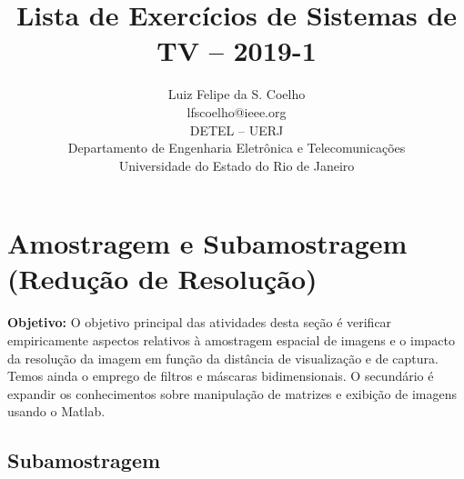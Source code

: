 \documentclass[11pt]{article}
\begin{document}
 

\title{Lista de Exercícios de Sistemas de TV -- 2019-1}
\author{Luiz Felipe da S. Coelho \\ lfscoelho@ieee.org \\ DETEL -- UERJ \\ Departamento de Engenharia Eletrônica e Telecomunicações \\ Universidade do Estado do Rio de Janeiro}

\maketitle

\section{Amostragem e Subamostragem (Redução de Resolução)}

\textbf{Objetivo:} O objetivo principal das atividades desta seção é verificar empiricamente aspectos relativos à amostragem espacial de imagens e o impacto da resolução da imagem em função da distância de visualização e de captura. Temos ainda o emprego de filtros e máscaras bidimensionais. O secundário é expandir os conhecimentos sobre manipulação de matrizes e exibição de imagens usando o \textsf{Matlab}.

\subsection{Subamostragem}
\end{document}
